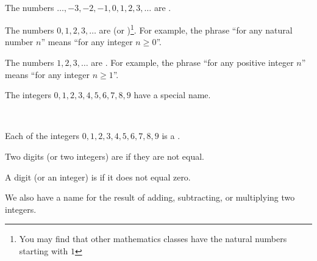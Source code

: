 \begin{defn} [Integers]
\label{defn_integers}
    ~
    \begin{apart}
        \item The numbers $\ldots, -3, -2, -1, 0, 1, 2, 3, \ldots$ are .
        \item The numbers $0, 1, 2, 3, \ldots$ are  (or )\footnote{You may find that other mathematics classes have the natural numbers starting with $1$}.  For example, the phrase ``for any natural number $n$'' means ``for any integer $n \ge 0$''.
        \item The numbers $1, 2, 3, \ldots$ are .  For example, the phrase ``for any positive integer $n$'' means ``for any integer $n \ge 1$''.
    \end{apart}
\end{defn}

The integers $0,1,2,3,4,5,6,7,8,9$ have a special name.

\begin{defn} [Digit]
\label{defn_digit}
    ~
    \begin{apart}
        \item Each of the integers $0,1,2,3,4,5,6,7,8,9$ is a .
         \item Two digits (or two integers) are  if they are not equal.
        \item A digit (or an integer) is  if it does not equal zero. 
    \end{apart} 
\end{defn}

We also have a name for the result of adding, subtracting, or multiplying two integers.

